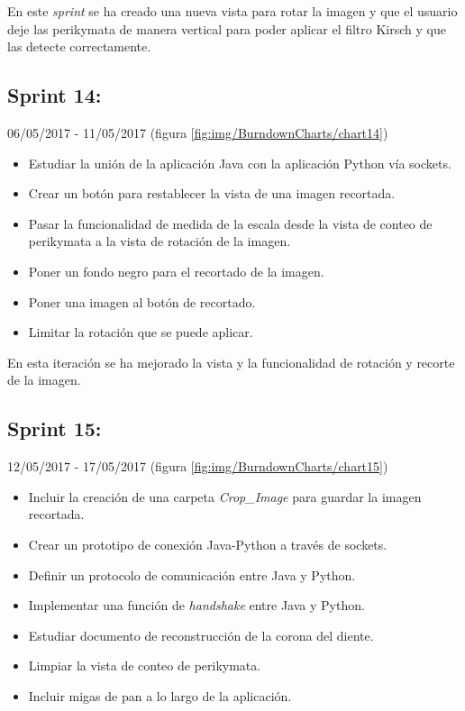 En este \textit{sprint} se ha creado una nueva vista para rotar la imagen y que el usuario deje las perikymata de manera vertical para poder aplicar el filtro Kirsch y que las detecte correctamente.

\newpage

\subsection{Sprint 14:}
06/05/2017 - 11/05/2017 (figura \ref{fig:img/BurndownCharts/chart14})
\begin{itemize}
    \item Estudiar la unión de la aplicación Java con la aplicación Python vía sockets.
    \item Crear un botón para restablecer la vista de una imagen recortada.
    \item Pasar la funcionalidad de medida de la escala desde la vista de conteo de perikymata a la vista de rotación de la imagen.
    \item Poner un fondo negro para el recortado de la imagen.
    \item Poner una imagen al botón de recortado.
    \item Limitar la rotación que se puede aplicar.
\end{itemize}

En esta iteración se ha mejorado la vista y la funcionalidad de rotación y recorte de la imagen.

\newpage
\subsection{Sprint 15:}
12/05/2017 - 17/05/2017 (figura \ref{fig:img/BurndownCharts/chart15})
\begin{itemize}
    \item Incluir la creación de una carpeta \textit{Crop\_Image} para guardar la imagen recortada.
    \item Crear un prototipo de conexión Java-Python a través de sockets.
    \item Definir un protocolo de comunicación entre Java y Python.
    \item Implementar una función de \textit{handshake} entre Java y Python.
    \item Estudiar documento de reconstrucción de la corona del diente.
    \item Limpiar la vista de conteo de perikymata.
    \item Incluir migas de pan a lo largo de la aplicación.
\end{itemize}

